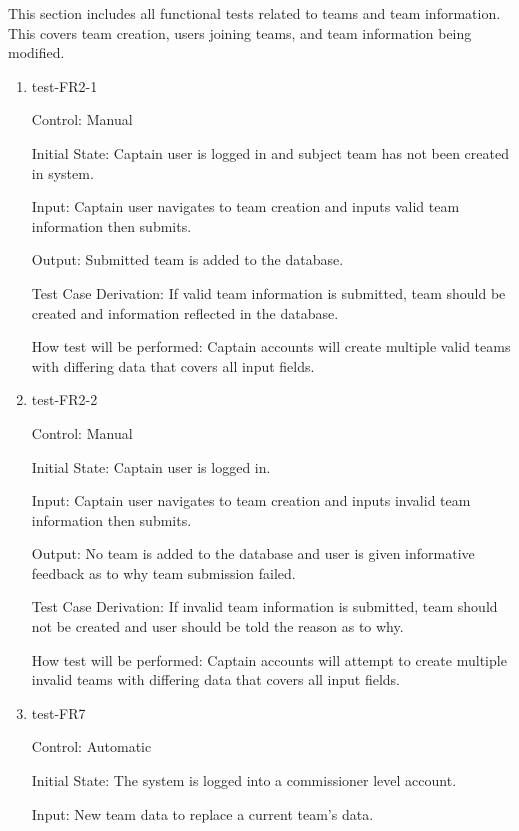 \documentclass[12pt, titlepage]{article}
\begin{document}
This section includes all functional tests related to teams and team
information. This covers team creation, users joining teams, and team
information being modified.

\begin{enumerate}

  \item{test-FR2-1\\}

  Control: Manual
            
  Initial State: Captain user is logged in and subject team has not been 
  created in system.
            
  Input: Captain user navigates to team creation and inputs valid team 
  information then submits. 
            
  Output: Submitted team is added to the database.
  
  Test Case Derivation: If valid team information is submitted, team
  should be created and information reflected in the database.
  
  How test will be performed: Captain accounts will create multiple
  valid teams with differing data that covers all input fields.

  \item{test-FR2-2\\}

  Control: Manual
            
  Initial State: Captain user is logged in.
            
  Input: Captain user navigates to team creation and inputs invalid team 
  information then submits. 
            
  Output: No team is added to the database and user is given informative 
  feedback as to why team submission failed.
  
  Test Case Derivation: If invalid team information is submitted, team
  should not be created and user should be told the reason as to why.
  
  How test will be performed: Captain accounts will attempt to create 
  multiple invalid teams with differing data that covers all input fields. 

  \item{test-FR7\\}

  Control: Automatic

  Initial State: The system is logged into a commissioner level account.
            
  Input: New team data to replace a current team's data.
            

\end{enumerate}
\end{document}
